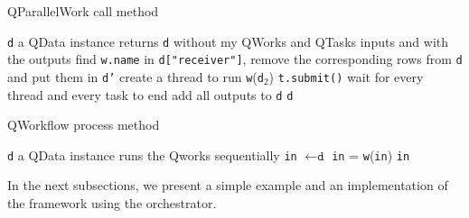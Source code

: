 \documentclass[10pt, conference, compsocconf]{IEEEtran}
\begin{document}
\begin{algorithm}
\caption{QParallelWork call method}
\label{alg:Qparallel}
\begin{algorithmic}
\REQUIRE \texttt{d} a QData instance
\ENSURE returns \texttt{d} without my QWorks and QTasks inputs and with the outputs
\STATE find \texttt{w.name} in \texttt{d["receiver"]}, remove the corresponding rows from \texttt{d} and put them in \texttt{d'}
\ENDFOR
{}
\STATE create a thread to run \texttt{w}(\texttt{d$_2$})
\ENDFOR
{}
\STATE \texttt{t.submit()}
\ENDFOR
\STATE wait for every thread and every task to end
\STATE add all outputs to \texttt{d}
\RETURN \texttt{d}
\end{algorithmic}
\end{algorithm}

\begin{algorithm}
\caption{QWorkflow process method}
\label{alg:Qworkflow}
\begin{algorithmic}
\REQUIRE \texttt{d} a QData instance
\ENSURE runs the Qworks sequentially
\STATE \texttt{in} $\leftarrow \texttt{d}$
\STATE \texttt{in} = \texttt{w}(\texttt{in})
\ENDFOR
\RETURN \texttt{in}
\end{algorithmic}
\end{algorithm}

In the next subsections, we present a simple example and an implementation of the framework using the orchestrator.
 
\end{document}
